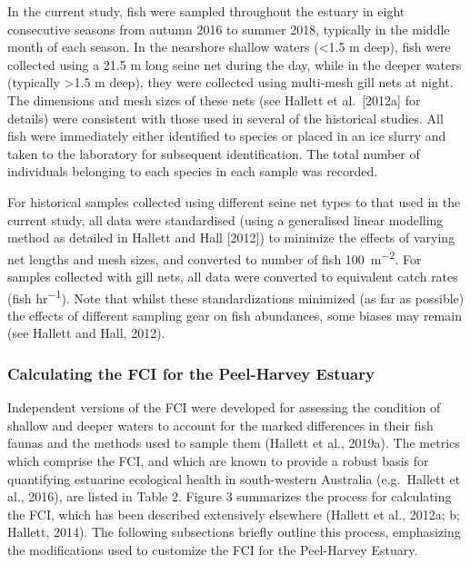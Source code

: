 \documentclass[
]{book}
\begin{document}
In the current study, fish were sampled throughout the estuary in eight consecutive seasons from autumn 2016 to summer 2018, typically in the middle month of each season. In the nearshore shallow waters (\textless1.5 m deep), fish were collected using a 21.5 m long seine net during the day, while in the deeper waters (typically \textgreater1.5 m deep), they were collected using multi-mesh gill nets at night. The dimensions and mesh sizes of these nets (see Hallett et al.~{[}2012a{]} for details) were consistent with those used in several of the historical studies. All fish were immediately either identified to species or placed in an ice slurry and taken to the laboratory for subsequent identification. The total number of individuals belonging to each species in each sample was recorded.~

For historical samples collected using different seine net types to that used in the current study, all data were standardised (using a generalised linear modelling method as detailed in Hallett and Hall {[}2012{]}) to minimize the effects of varying net lengths and mesh sizes, and converted to number of fish 100~m\textsuperscript{−2}. For samples collected with gill nets, all data were converted to equivalent catch rates (fish hr\textsuperscript{−1}). Note that whilst these standardizations minimized (as far as possible) the effects of different sampling gear on fish abundances, some biases may remain (see Hallett and Hall, 2012).

\hypertarget{calculating-the-fci-for-the-peel-harvey-estuary}{%
\subsubsection{Calculating the FCI for the Peel-Harvey Estuary}\label{calculating-the-fci-for-the-peel-harvey-estuary}}

Independent versions of the FCI were developed for assessing the condition of shallow and deeper waters to account for the marked differences in their fish faunas and the methods used to sample them (Hallett et al., 2019a). The metrics which comprise the FCI, and which are known to provide a robust basis for quantifying estuarine ecological health in south-western Australia (e.g.~Hallett et al., 2016), are listed in Table 2. Figure 3 summarizes the process for calculating the FCI, which has been described extensively elsewhere (Hallett et al., 2012a; b; Hallett, 2014). The following subsections briefly outline this process, emphasizing the modifications used to customize the FCI for the Peel-Harvey Estuary.
\end{document}
